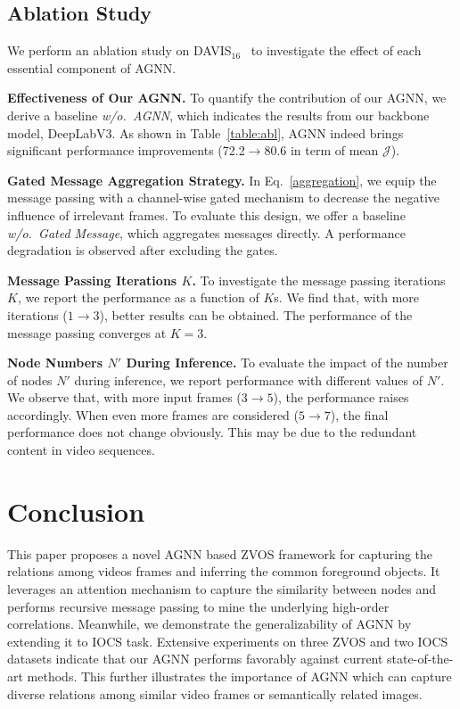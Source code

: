 \documentclass[10pt,twocolumn,letterpaper]{article}
\begin{document}
	\vspace*{-5pt}
\subsection{Ablation Study}\label{sec:ablation}
	\vspace*{-3pt}	
We perform an ablation
study on DAVIS$_{16}$~\cite{perazzi2016benchmark} to investigate the effect of each essential component of AGNN.

\noindent\textbf{Effectiveness of Our AGNN.} To quantify the contribution of our AGNN, we derive a baseline \textit{w/o.~AGNN}, which indicates the results from our backbone model, DeepLabV3. As shown in Table~\ref{table:abl}, AGNN indeed brings significant performance improvements (72.2$\rightarrow$80.6 in term of mean $\mathcal{J}$).

\noindent\textbf{Gated Message Aggregation Strategy.} In Eq.~\ref{aggregation}, we equip the message passing with a channel-wise gated mechanism to decrease the negative influence of irrelevant frames. To evaluate this design, we offer a baseline \textit{w/o.~Gated Message}, which aggregates messages directly. A performance degradation is observed after excluding the gates.

\noindent\textbf{Message Passing Iterations $K$.} To investigate the message passing iterations  $K$, we report the performance as a function of $K$s. We find that, with more iterations ($1\!\rightarrow\!3$), better results can be obtained. The performance of the message passing converges at $K\!=\!3$.

\noindent\textbf{Node Numbers $N'$ During Inference.}
To evaluate the impact of the number of nodes $N'$ during inference, we report performance with different values of $N'$.  We observe that, with more input frames ($3\!\rightarrow\!5$), the performance raises accordingly.  When even more frames are considered ($5\!\rightarrow\!7$), the final performance does not change obviously. This may be due to the redundant content in video sequences.







	\vspace*{-10pt}
\section{Conclusion}
	\vspace*{-4pt}	
This paper proposes a novel AGNN based ZVOS framework for capturing the relations among videos frames and inferring the common foreground objects. It leverages an attention mechanism to capture the similarity between nodes and performs recursive message passing to mine the underlying high-order correlations. Meanwhile, we demonstrate the generalizability of AGNN  by extending it to IOCS task. Extensive experiments on three ZVOS and two IOCS datasets indicate that our AGNN performs favorably against current state-of-the-art methods. This further illustrates the importance of  AGNN which can capture diverse relations among similar video frames or semantically related images. 
\end{document}
